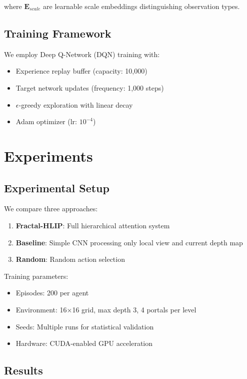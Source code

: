 \documentclass[11pt]{article}
\begin{document}
where $\mathbf{E}_{scale}$ are learnable scale embeddings distinguishing observation types.

\subsection{Training Framework}

We employ Deep Q-Network (DQN) training with:
\begin{itemize}
    \item Experience replay buffer (capacity: 10,000)
    \item Target network updates (frequency: 1,000 steps)
    \item $\epsilon$-greedy exploration with linear decay
    \item Adam optimizer (lr: $10^{-4}$)
\end{itemize}

\section{Experiments}

\subsection{Experimental Setup}

We compare three approaches:
\begin{enumerate}
    \item \textbf{Fractal-HLIP}: Full hierarchical attention system
    \item \textbf{Baseline}: Simple CNN processing only local view and current depth map
    \item \textbf{Random}: Random action selection
\end{enumerate}

Training parameters:
\begin{itemize}
    \item Episodes: 200 per agent
    \item Environment: 16×16 grid, max depth 3, 4 portals per level
    \item Seeds: Multiple runs for statistical validation
    \item Hardware: CUDA-enabled GPU acceleration
\end{itemize}

\subsection{Results}
\end{document}
